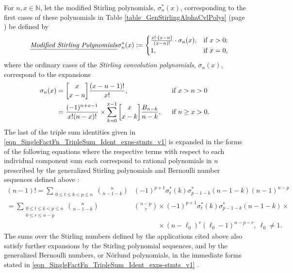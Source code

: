 \documentclass[12pt,reqno]{article}
\numberwithin{sfootnote}{section}
\newcommand{\tableref}[1]{Table \ref{#1} (page \pageref{#1})}
\numberwithin{equation}{section}
\newcommand{\tagtext}[1]{\tag*{\underline{\textit{#1}}}}
\theoremstyle{DefaultTheoremStyle}
\theoremstyle{definition}
\newcommand{\cf}[0]{cf.\ }
\newcommand{\defequals}{\ensuremath{\vcentcolon=}}
\newcommand{\gkpSI}[2]{\ensuremath{\genfrac{\lbrack}{\rbrack}{0pt}{}{#1}{#2}}}
\begin{document}
For $n, x \in \mathbb{N}$, 
let the modified Stirling polynomials, $\sigma_n^{\ast}(x)$, 
corresponding to the first cases of these polynomials in 
\tableref{table_GenStirlingAlphaCvlPolys} be defined by 
\begin{align*} 
\tagtext{Modified Stirling Polynomials} 
\sigma_n^{\ast}(x) & \defequals 
     \begin{cases} 
     \frac{x! \cdot (x-n)}{(x-n)!} \cdot \sigma_n(x), & 
     \text{if $x > 0$;} \\ 
     1, & \text{if $x = 0$,} 
     \end{cases} 
\end{align*} 
where the ordinary cases of the 
\emph{Stirling convolution polynomials}, $\sigma_n(x)$, 
correspond to the expansions 
\citep[\S 6.2, Ex.\ 6.77]{GKP} 
\begin{align*} 
\sigma_n(x) & = 
     \gkpSI{x}{x-n} \frac{(x-n-1)!}{x!},\ && 
     \text{ if $x > n > 0$ } \\ 
     & = 
     \frac{(-1)^{n+x-1}}{x! (n-x)!} \times 
     \sum_{k=0}^{x-1} \gkpSI{x}{x-k} \frac{B_{n-k}}{n-k},\ && 
     \text{ if $n \geq x > 0$. } 
\end{align*} 
The last of the triple sum identities given in 
\eqref{eqn_SingleFactFn_TripleSum_Ident_exps-stmts_v1} is expanded 
in the forms of the following equations where the respective 
terms with respect to each individual component sum each correspond to 
rational polynomials in $n$ prescribed by the generalized 
Stirling polynomials and Bernoulli number sequences 
defined above \citep[\cf \S 6.2, \S 7.4]{GKP} \citep{MULTIFACTJIS,CVLPOLYS}: 
\begin{align*} 
(n-1)! = 
     \sum\limits_{\substack{0 \leq t \leq k < p \leq n}} 
     \binom{n}{n-1-k} & (-1)^{p+1} 
     \sigma_t^{\ast}(k) \sigma_{p-1-k}^{\ast}(n-1-k) 
     (n-1)^{n-p} \\ 
     = 
     \sum\limits_{\substack{0 \leq t \leq k < p \leq n \\ 
                            0 \leq r \leq n-p}} 
     \binom{n}{n-1-k} & \binom{n-p}{r} \times (-1)^{p+1} 
     \sigma_t^{\ast}(k) \sigma_{p-1-k}^{\ast}(n-1-k) \times \\ 
     & \phantom{\binom{n-p}{r}} \times 
     (n-\ell_0)^{r} (\ell_0-1)^{n-p-r},\ 
     \ell_0 \neq 1. 
\end{align*} 
The sums over the Stirling numbers defined by the applications 
cited above also satisfy further expansions by the 
Stirling polynomial sequences, and by the 
generalized Bernoulli numbers, or N\"{o}rlund polynomials, 
in the immediate forms stated in 
\eqref{eqn_SingleFactFn_TripleSum_Ident_exps-stmts_v1} 
\citep{MULTIFACTJIS}. 
\end{document}
